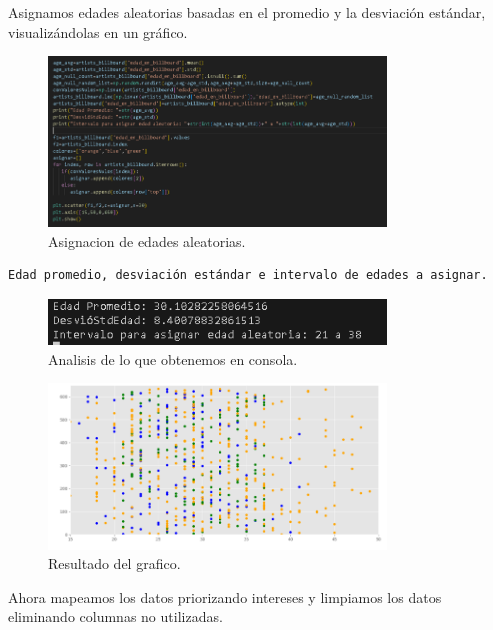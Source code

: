 \documentclass[a4paper,12pt]{article}
\begin{document}
Asignamos edades aleatorias basadas en el promedio y la desviación estándar, visualizándolas en un gráfico.

\begin{figure}[H]
    \centering
    \includegraphics[width=0.8\textwidth]{15.png}
    \caption{Asignacion de edades aleatorias.}
    \label{fig:decision_tree}
\end{figure}

\begin{verbatim}
Edad promedio, desviación estándar e intervalo de edades a asignar.
\end{verbatim}

\begin{figure}[H]
    \centering
    \includegraphics[width=0.8\textwidth]{16.png}
    \caption{Analisis de lo que obtenemos en consola.}
    \label{fig:decision_tree}
\end{figure}

\begin{figure}[H]
    \centering
    \includegraphics[width=0.8\textwidth]{17.png}
    \caption{Resultado del grafico.}
    \label{fig:decision_tree}
\end{figure}

Ahora mapeamos los datos priorizando intereses y limpiamos los datos eliminando columnas no utilizadas.
\end{document}
